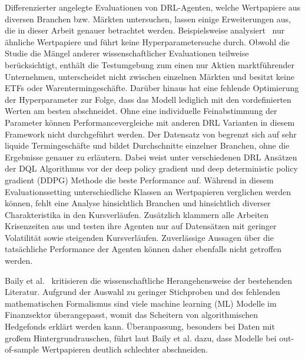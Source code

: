 Differenzierter angelegte Evaluationen von \acs{DRL}-Agenten, welche Wertpapiere aus diversen Branchen bzw. Märkten untersuchen, lassen einige Erweiterungen aus, die in dieser Arbeit genauer betrachtet werden.
Beispielsweise analysiert~\parencite{théate2020application} nur ähnliche Wertpapiere und führt keine Hyperparametersuche durch. 
Obwohl die Studie die Mängel anderer wissenschaftlicher Evaluationen teilweise berücksichtigt, enthält die Testumgebung zum einen nur Aktien marktführender Unternehmen, unterscheidet nicht zwischen einzelnen Märkten und besitzt keine ETFs oder Warentermingeschäfte.
Darüber hinaus hat eine fehlende Optimierung der Hyperparameter zur Folge, dass das Modell lediglich mit den vordefinierten Werten am besten abschneidet.
Ohne eine individuelle Feinabstimmung der Parameter können Performancevergleiche mit anderen \acs{DRL} Varianten in diesem Framework nicht durchgeführt werden.
Der Datensatz von \parencite{zhang2019deep} begrenzt sich auf sehr liquide Termingeschäfte und bildet Durchschnitte einzelner Branchen, ohne die Ergebnisse genauer zu erläutern. Dabei weist unter verschiedenen \acs{DRL} Ansätzen der \acs{DQL} Algorithmus vor der deep policy gradient und deep deterministic policy gradient (\acs{DDPG}) Methode die beste Performance auf. 
Während in diesem Evaluationssetting unterschiedliche Klassen an Wertpapieren verglichen werden können, fehlt eine Analyse hinsichtlich Branchen und hinsichtlich diverser Charakteristika in den Kursverläufen.
Zusätzlich klammern alle Arbeiten Krisenzeiten aus und testen ihre Agenten nur auf Datensätzen mit geringer Volatilität sowie steigenden Kursverläufen. Zuverlässige Aussagen über die tatsächliche Performance der Agenten können daher ebenfalls nicht getroffen werden.

Baily et al.~\parencite{Pseudo-Mathematics} kritisieren die wissenschaftliche Herangehensweise der bestehenden Literatur. 
Aufgrund der Auswahl zu geringer Stichproben und des fehlenden mathematischen Formalismus sind viele machine learning (\acs{ML}) Modelle im Finanzsektor überangepasst, womit das Scheitern von algorithmischen Hedgefonds erklärt werden kann. Überanpassung, besonders bei Daten mit großem Hintergrundrauschen, führt laut Baily et al. dazu, dass Modelle bei out-of-sample Wertpapieren deutlich schlechter abschneiden.


